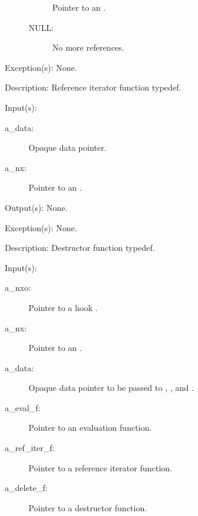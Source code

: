 \begin{capi}
\begin{capilist}
\begin{description}
\begin{description}
				Pointer to an .
			\item[NULL: ]
				No more references.
			\end{description}
		\end{description}
	\item[Exception(s): ] None.
	\item[Description: ]
		Reference iterator function typedef.
	\end{capilist}
\label{cw_nxo_hook_delete_t}
	\begin{capilist}
	\item[Input(s): ]
		\begin{description}\item[]
		\item[a\_data: ]
			Opaque data pointer.
		\item[a\_nx: ]
			Pointer to an .
		\end{description}
	\item[Output(s): ] None.
	\item[Exception(s): ] None.
	\item[Description: ]
		Destructor function typedef.
	\end{capilist}
\label{nxo_hook_new}
	\begin{capilist}
	\item[Input(s): ]
		\begin{description}\item[]
		\item[a\_nxo: ]
			Pointer to a hook \classname{nxo}.
		\item[a\_nx: ]
			Pointer to an \classname{nx}.
		\item[a\_data: ]
			Opaque data pointer to be passed to \cvar{a\_eval\_f},
			, and \cvar{a\_delete\_f}.
		\item[a\_eval\_f: ]
			Pointer to an evaluation function.
		\item[a\_ref\_iter\_f: ]
			Pointer to a reference iterator function.
		\item[a\_delete\_f: ]
			Pointer to a destructor function.
		\end{description}

\end{capilist}
\end{capi}
